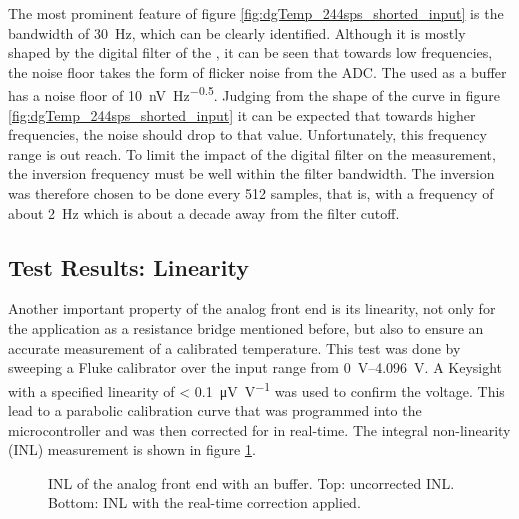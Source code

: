 The most prominent feature of figure \ref{fig:dgTemp_244sps_shorted_input} is the bandwidth of \qty{30}{\Hz}, which can be clearly identified. Although it is mostly shaped by the digital filter of the , it can be seen that towards low frequencies, the noise floor takes the form of flicker noise from the ADC. The  used as a buffer has a noise floor of \qty{10}{\nV \Hz\tothe{-0.5}}. Judging from the shape of the curve in figure \ref{fig:dgTemp_244sps_shorted_input} it can be expected that towards higher frequencies, the noise should drop to that value. Unfortunately, this frequency range is out reach. To limit the impact of the digital filter on the measurement, the inversion frequency must be well within the filter bandwidth. The inversion was therefore chosen to be done every \num{512} samples, that is, with a frequency of about \qty{2}{\Hz} which is about a decade away from the filter cutoff.

\subsection{Test Results: Linearity}
Another important property of the analog front end is its linearity, not only for the application as a resistance bridge mentioned before, but also to ensure an accurate measurement of a calibrated temperature. This test was done by sweeping a Fluke  calibrator over the input range from \qtyrange[range-units = single, range-phrase={~to~}]{0}{4.096}{\V}. A Keysight  with a specified linearity of \qty{< 0.1}{\uV \per \V} was used to confirm the voltage. This lead to a parabolic calibration curve that was programmed into the microcontroller and was then corrected for in real-time. The integral non-linearity (INL) measurement is shown in figure \ref{fig:dgTemp_inl}.
\begin{figure}[ht]
    \centering
    
    \caption{INL of the analog front end with an  buffer. Top: uncorrected INL. Bottom: INL with the real-time correction applied.}
    \label{fig:dgTemp_inl}
\end{figure}

